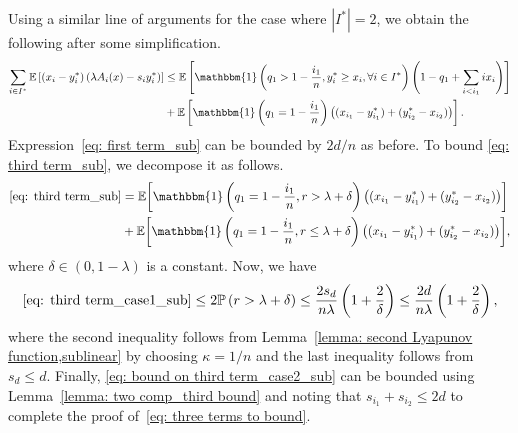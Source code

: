 \documentclass[a4paper]{article}
\def\ind{\mathbbm{1}}
\theoremstyle{plain}
\theoremstyle{definition}
\theoremstyle{case}
\theoremstyle{remark}
\newcommand{\brac}[1]{\left(#1\right)}
\newcommand{\sbrac}[1]{\left[#1\right]}
\newcommand{\expect}[1]{\mathbb{E}\sbrac{#1}}
\begin{document}
Using a similar line of arguments for the case where $|I^*|=2$, we obtain the following after some simplification.
\begin{align}    
   \sum_{i \in I^*} \expect{\brac{x_i - y_i^*} \brac{\lambda A_i(x) - s_i y_i^*}} 
    & \leq \expect{ \ind\brac{q_1 > 1- \frac{i_1}{n}, y_{i}^*\geq x_i, \forall i \in I^*} \brac{1-q_1+\sum_{i < i_1} i x_i}} \label{eq: first term_sub}
    \\&+ \expect{\ind \brac{q_1 =1 - \frac{i_1}{n}}\brac{(x_{i_1} - y_{i_1}^*)+(y_{i_2}^* - x_{i_2})}}\label{eq: third term_sub}.
\end{align}
%
Expression~\eqref{eq: first term_sub} can be bounded by $2d/n$ as before.
%
To bound \eqref{eq: third term_sub}, we decompose it as follows.
\begin{align} 
    \eqref{eq: third term_sub}
     & = \mathbb{E}\biggl[\ind\brac{q_1 = 1- \frac{i_1}{n}, r > \lambda + \delta} 
    \brac{(x_{i_1} - y_{i_1}^*)+(y_{i_2}^* - x_{i_2})}\biggr]\label{eq: third term_case1_sub}
    \\& +\mathbb{E}\biggl[\ind\brac{q_1 = 1- \frac{i_1}{n}, r \leq \lambda + \delta} 
   \brac{(x_{i_1} - y_{i_1}^*)+(y_{i_2}^* - x_{i_2})}\biggr],\label{eq: bound on third term_case2_sub}
\end{align}
%
where $\delta \in (0 , 1- \lambda)$ is a constant. Now, we have
\begin{equation}
   \eqref{eq: third term_case1_sub}
    \leq 2 \mathbb{P}\brac{ r > \lambda + \delta} \leq \frac{2s_d}{n\lambda}\brac{1+\frac{2}{\delta}}\leq \frac{2d}{n\lambda}\brac{1+\frac{2}{\delta}},
\end{equation}
%
where the second inequality follows from Lemma~\ref{lemma: second Lyapunov function,sublinear} by choosing $\kappa=1/n$ and the last inequality follows from $s_d \leq d$. Finally, \eqref{eq: bound on third term_case2_sub} can be bounded using Lemma~\ref{lemma: two comp_third bound} and noting that 
$s_{i_1}+s_{i_2}\leq 2d$ to complete the proof of~\eqref{eq: three terms to bound}.
\end{document}
